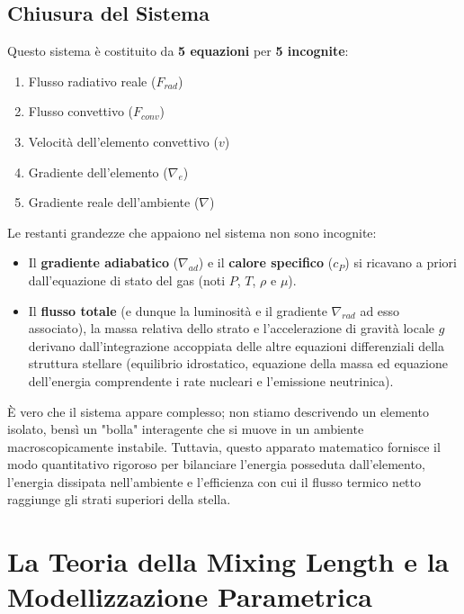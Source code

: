 \subsection{Chiusura del Sistema}
Questo sistema è costituito da \textbf{5 equazioni} per \textbf{5 incognite}:
\begin{enumerate}
\item Flusso radiativo reale ($F_{rad}$)
\item Flusso convettivo ($F_{conv}$)
\item Velocità dell'elemento convettivo ($v$)
\item Gradiente dell'elemento ($\nabla_e$)
\item Gradiente reale dell'ambiente ($\nabla$)
\end{enumerate}

Le restanti grandezze che appaiono nel sistema non sono incognite:
\begin{itemize}
\item Il \textbf{gradiente adiabatico} ($\nabla_{ad}$) e il \textbf{calore specifico} ($c_P$) si ricavano a priori dall'equazione di stato del gas (noti $P$, $T$, $\rho$ e $\mu$).
\item Il \textbf{flusso totale} (e dunque la luminosità e il gradiente $\nabla_{rad}$ ad esso associato), la massa relativa dello strato e l'accelerazione di gravità locale $g$ derivano dall'integrazione accoppiata delle altre equazioni differenziali della struttura stellare (equilibrio idrostatico, equazione della massa ed equazione dell'energia comprendente i rate nucleari e l'emissione neutrinica).
\end{itemize}

È vero che il sistema appare complesso; non stiamo descrivendo un elemento isolato, bensì un "bolla" interagente che si muove in un ambiente macroscopicamente instabile. Tuttavia, questo apparato matematico fornisce il modo quantitativo rigoroso per bilanciare l'energia posseduta dall'elemento, l'energia dissipata nell'ambiente e l'efficienza con cui il flusso termico netto raggiunge gli strati superiori della stella.

\section{La Teoria della Mixing Length e la Modellizzazione Parametrica}

